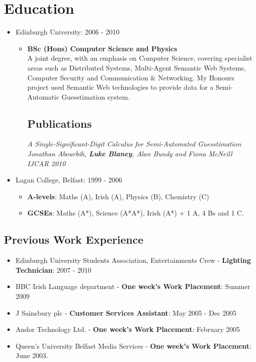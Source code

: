 \documentclass[a4paper]{article}
\begin{document}
\section*{Education}
\begin{itemize}

\item Edinburgh University: 2006 - 2010 \begin{itemize}\item {\bf BSc (Hons) Computer Science and Physics}\\
A joint degree, with an emphasis on Computer Science, covering specialist areas such as Distributed Systems, Multi-Agent Semantic Web Systems, Computer Security and Communication \& Networking.
My Honours project used Semantic Web technologies to provide data for a Semi-Automatic Guesstimation system.
\subsection*{Publications}
\em A Single-Significant-Digit Calculus for Semi-Automated Guesstimation \em\\
Jonathan Abourbih, {\bf Luke Blaney}, Alan Bundy and Fiona McNeill\\
IJCAR 2010
\end{itemize}

\item Lagan College, Belfast: 1999 - 2006
\begin{itemize}\item {\bf A-levels}: Maths (A), Irish (A), Physics (B), Chemistry (C)
\item {\bf GCSEs}: Maths (A*), Science (A*A*), Irish (A*) + 1 A, 4 Bs and 1 C.
\end{itemize}

\end{itemize}

\subsection*{Previous Work Experience}
\begin{itemize}

\item Edinburgh University Students Association, Entertainments Crew - {\bf Lighting Technician}: 2007 - 2010
\item BBC Irish Language department - {\bf One week's Work Placement}: Summer 2009
\item J Sainsbury plc - {\bf Customer Services Assistant}: May 2005 - Dec 2005
\item Andor Technology Ltd. - {\bf One week's Work Placement}:  February 2005
\item Queen's University Belfast Media Services - {\bf One week's Work Placement}:  June 2003.

\end{itemize}
\end{document}
